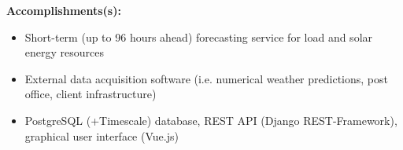 \documentclass{mycv}
\begin{document}
\begin{myitemize}
		\vspace{0.15cm}
		\textbf{Accomplishments(s):}
		
		\begin{itemize}[itemsep=1px]
			\item Short-term (up to 96 hours ahead) forecasting service for load and solar energy resources
			\item External data acquisition software (i.e. numerical weather predictions, post office, client infrastructure)
			\item PostgreSQL (+Timescale) database, REST API (Django REST-Framework), graphical user interface (Vue.js)
		\end{itemize}
		
\end{myitemize}	

\vspace{0.15cm}	
\end{document}

